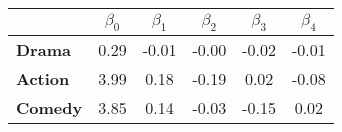 \begin{tabular}{|l|c|c|c|c|c|}
\hline
&\textbf{$\beta_{0}$}&\textbf{$\beta_{1}$}&\textbf{$\beta_{2}$}&\textbf{$\beta_{3}$}&\textbf{$\beta_{4}$}\\\hline
\textbf{Drama}&0.29&-0.01&-0.00&-0.02&-0.01\\\hline
\textbf{Action}&3.99&0.18&-0.19&0.02&-0.08\\\hline
\textbf{Comedy}&3.85&0.14&-0.03&-0.15&0.02\\\hline
\end{tabular}
